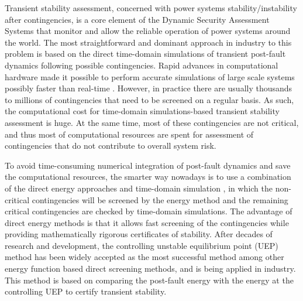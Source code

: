 \documentclass[final]{IEEEtran}
\begin{document}
Transient stability
assessment, concerned with power systems stability/instability after contingencies, is a core
element of the Dynamic
Security Assessment Systems that monitor and allow the reliable operation of power systems around the world. 
The most straightforward and dominant approach in
industry to this problem is based on the direct time-domain simulations of transient
post-fault dynamics following possible contingencies. Rapid advances in
computational hardware made it possible to perform accurate
simulations of large scale systems possibly faster than real-time
\cite{Huang:2012il,Nagel:2013kf}. However, in practice there are usually
thousands to millions of contingencies that need to be screened on
a regular basis. As such, the computational cost for time-domain
simulations-based transient stability assessment is huge. At the same time, most of these contingencies are not critical, and thus most of computational resources are spent for assessment of contingencies that do not contribute to overall system risk.


To avoid time-consuming numerical integration of post-fault
dynamics and save the computational resources, the smarter way
nowadays is to use a combination of the direct energy approaches
and time-domain simulation
\cite{Pai:1981dv,chang1995direct,Chiang:2011eo}, in which the
non-critical contingencies will be screened by the energy method
and the remaining critical contingencies are checked by
time-domain simulations. The advantage of direct energy methods is
that it allows fast screening of the contingencies while providing
mathematically rigorous certificates of stability. After decades
of research and development, the controlling unstable equilibrium
point (UEP) method \cite{Chiang:1994ir} has been widely accepted as the
most successful method among other energy function based direct
screening methods, and is being applied in industry. This method is
based on comparing the post-fault energy with the energy at the
controlling UEP to certify transient stability.
\end{document}
